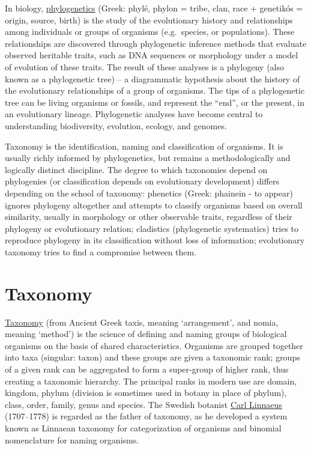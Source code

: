 In biology,
\href{https://en.wikipedia.org/wiki/Phylogenetics}{phylogenetics}
(Greek: phylé, phylon = tribe, clan, race + genetikós = origin, source,
birth) is the study of the evolutionary history and relationships among
individuals or groups of organisms (e.g.~species, or populations). These
relationships are discovered through phylogenetic inference methods that
evaluate observed heritable traits, such as DNA sequences or morphology
under a model of evolution of these traits. The result of these analyses
is a phylogeny (also known as a phylogenetic tree) -- a diagrammatic
hypothesis about the history of the evolutionary relationships of a
group of organisms. The tips of a phylogenetic tree can be living
organisms or fossils, and represent the ``end'', or the present, in an
evolutionary lineage. Phylogenetic analyses have become central to
understanding biodiversity, evolution, ecology, and genomes.

Taxonomy is the identification, naming and classification of organisms.
It is usually richly informed by phylogenetics, but remains a
methodologically and logically distinct discipline. The degree to which
taxonomies depend on phylogenies (or classification depends on
evolutionary development) differs depending on the school of taxonomy:
phenetics (Greek: phainein - to appear) ignores phylogeny altogether and
attempts to classify organisms based on overall similarity, usually in
morphology or other observable traits, regardless of their phylogeny or
evolutionary relation; cladistics (phylogenetic systematics) tries to
reproduce phylogeny in its classification without loss of information;
evolutionary taxonomy tries to find a compromise between them.  

\section{Taxonomy}\label{taxonomy}

\href{https://en.wikipedia.org/wiki/Taxonomy_(biology)}{Taxonomy} (from
Ancient Greek taxis, meaning `arrangement', and nomia, meaning `method')
is the science of defining and naming groups of biological organisms on
the basis of shared characteristics. Organisms are grouped together into
taxa (singular: taxon) and these groups are given a taxonomic rank;
groups of a given rank can be aggregated to form a super-group of higher
rank, thus creating a taxonomic hierarchy. The principal ranks in modern
use are domain, kingdom, phylum (division is sometimes used in botany in
place of phylum), class, order, family, genus and species. The Swedish
botanist \href{https://en.wikipedia.org/wiki/Carl_Linnaeus}{Carl Linnaeus} (1707--1778) is regarded as the father of taxonomy, as he
developed a system known as Linnaean taxonomy for categorization of
organisms and binomial nomenclature for naming organisms.

